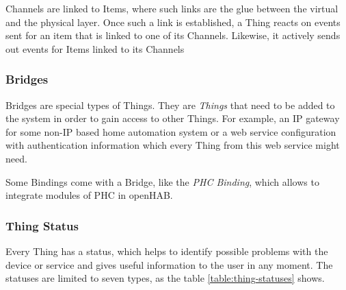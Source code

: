 Channels are linked to Items, where such links are the glue between the virtual and the physical layer. Once such a link is established,
a Thing reacts on events sent for an item that is linked to one of its Channels. Likewise, it actively sends out events for Items linked to its
Channels

\subsubsection{Bridges}
Bridges are special types of Things. They are \textit{Things} that need to be added to the system in order to gain access to other Things.
For example, an IP gateway for some non-IP based home automation system or a web service configuration with authentication information
which every Thing from this web service might need.

Some Bindings come with a Bridge, like the \textit{PHC Binding}, which allows to integrate modules of PHC in openHAB.\cite{openHABPHCBinding}

\subsubsection{Thing Status}
Every Thing has a status, which helps to identify possible problems with the device or service and gives useful information to the user
in any moment. The statuses are limited to seven types, as the table \ref{table:thing-statuses} shows.

